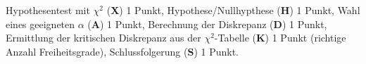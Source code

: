 \begin{bewertung}
Hypothesentest mit $\chi^2$ ({\bf X}) 1 Punkt,
Hypothese/Nullhypthese ({\bf H}) 1 Punkt,
Wahl eines geeigneten $\alpha$ ({\bf A}) 1 Punkt,
Berechnung der Diskrepanz ({\bf D}) 1 Punkt,
Ermittlung der kritischen Diskrepanz aus der $\chi^2$-Tabelle ({\bf K})
1 Punkt (richtige Anzahl Freiheitsgrade),
Schlussfolgerung ({\bf S}) 1 Punkt.
\end{bewertung}


